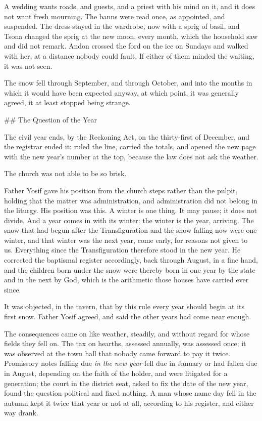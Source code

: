 \documentclass[11pt]{article}
\begin{document}
A wedding wants roads, and guests, and a priest with his mind on it, and it does not want fresh mourning. The banns were read once, as appointed, and suspended. The dress stayed in the wardrobe, now with a sprig of basil, and Tsona changed the sprig at the new moon, every month, which the household saw and did not remark. Andon crossed the ford on the ice on Sundays and walked with her, at a distance nobody could fault. If either of them minded the waiting, it was not seen.

The snow fell through September, and through October, and into the months in which it would have been expected anyway, at which point, it was generally agreed, it at least stopped being strange.

\#\# The Question of the Year

The civil year ends, by the Reckoning Act, on the thirty-first of December, and the registrar ended it: ruled the line, carried the totals, and opened the new page with the new year's number at the top, because the law does not ask the weather.

The church was not able to be so brisk.

Father Yosif gave his position from the church steps rather than the pulpit, holding that the matter was administration, and administration did not belong in the liturgy. His position was this. A winter is one thing. It may pause; it does not divide. And a year comes in with its winter: the winter is the year, arriving. The snow that had begun after the Transfiguration and the snow falling now were one winter, and that winter was the next year, come early, for reasons not given to us. Everything since the Transfiguration therefore stood in the new year. He corrected the baptismal register accordingly, back through August, in a fine hand, and the children born under the snow were thereby born in one year by the state and in the next by God, which is the arithmetic those houses have carried ever since.

It was objected, in the tavern, that by this rule every year should begin at its first snow. Father Yosif agreed, and said the other years had come near enough.

The consequences came on like weather, steadily, and without regard for whose fields they fell on. The tax on hearths, assessed annually, was assessed once; it was observed at the town hall that nobody came forward to pay it twice. Promissory notes falling due \emph{in the new year} fell due in January or had fallen due in August, depending on the faith of the holder, and were litigated for a generation; the court in the district seat, asked to fix the date of the new year, found the question political and fixed nothing. A man whose name day fell in the autumn kept it twice that year or not at all, according to his register, and either way drank.
\end{document}
